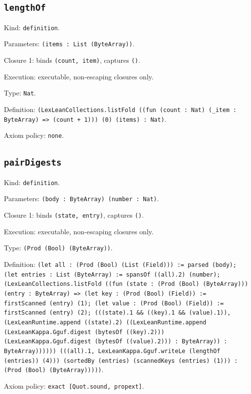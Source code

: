 \documentclass[11pt]{article}
\begin{document}
\subsection*{\texttt{lengthOf}}
\noindent Kind: \texttt{definition}.\par
\noindent Parameters: \texttt{(items : List (ByteArray))}.\par
\noindent Closure 1: binds \texttt{(count, item)}, captures \texttt{()}.\par
\noindent Execution: executable, non-escaping closures only.\par
\noindent Type: \texttt{Nat}.\par
\noindent Definition: \texttt{(LexLeanCollections.listFold ((fun (count : Nat) (\_item : ByteArray) => (count + 1))) (0) (items) : Nat)}.\par
\noindent Axiom policy: \texttt{none}.\par
\subsection*{\texttt{pairDigests}}
\noindent Kind: \texttt{definition}.\par
\noindent Parameters: \texttt{(body : ByteArray) (number : Nat)}.\par
\noindent Closure 1: binds \texttt{(state, entry)}, captures \texttt{()}.\par
\noindent Execution: executable, non-escaping closures only.\par
\noindent Type: \texttt{(Prod (Bool) (ByteArray))}.\par
\noindent Definition: \texttt{(let all : (Prod (Bool) (List (Field))) := parsed (body); (let entries : List (ByteArray) := spansOf ((all).2) (number); (LexLeanCollections.listFold ((fun (state : (Prod (Bool) (ByteArray))) (entry : ByteArray) => (let key : (Prod (Bool) (Field)) := firstScanned (entry) (1); (let value : (Prod (Bool) (Field)) := firstScanned (entry) (2); (((state).1 \&\& ((key).1 \&\& (value).1)), (LexLeanRuntime.append ((state).2) ((LexLeanRuntime.append (LexLeanKappa.Gguf.digest (bytesOf ((key).2))) (LexLeanKappa.Gguf.digest (bytesOf ((value).2))) : ByteArray)) : ByteArray)))))) (((all).1, LexLeanKappa.Gguf.writeLe (lengthOf (entries)) (4))) (sortedBy (entries) (scannedKeys (entries) (1))) : (Prod (Bool) (ByteArray)))))}.\par
\noindent Axiom policy: \texttt{exact [Quot.sound, propext]}.\par
\end{document}
